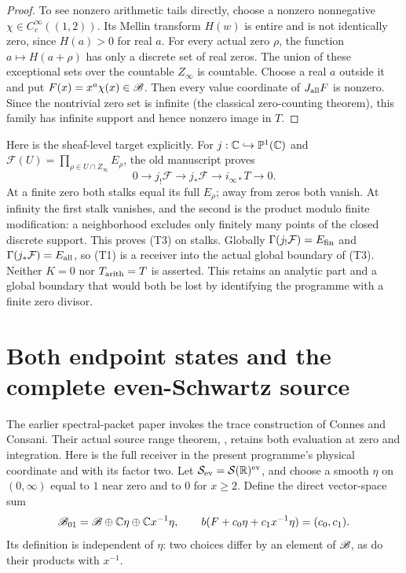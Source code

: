 \documentclass[11pt]{article}
\begin{document}
\begin{proof}
To see nonzero arithmetic tails directly, choose a nonzero nonnegative
$\chi\in C_c^\infty((1,2))$. Its Mellin transform $H(w)$ is entire
and is not identically zero, since $H(a)>0$ for real $a$.
For every actual zero $\rho$, the function $a\mapsto H(a+\rho)$
has only a discrete set of real zeros. The union of these exceptional
sets over the countable $Z_\infty$ is countable. Choose a real $a$
outside it and put $F(x)=x^a\chi(x)\in\mathscr B$.
Then every value coordinate of $J_{\rm all}F$ is nonzero. Since the
nontrivial zero set is infinite (the classical zero-counting theorem),
this family has infinite support and hence nonzero image in $T$.
\end{proof}

Here is the sheaf-level target explicitly. For $j:\mathbb C\hookrightarrow
\mathbb P^1(\mathbb C)$ and $\mathcal F(U)=\prod_{\rho\in U\cap Z_\infty}
E_\rho$, the old manuscript proves
\[
 0\to j_!\mathcal F\to j_*\mathcal F\to i_{\infty*}T\to0.\tag{T3}
\]
At a finite zero both stalks equal its full $E_\rho$; away from zeros
both vanish. At infinity the first stalk vanishes, and the second is
the product modulo finite modification: a neighborhood excludes only
finitely many points of the closed discrete support. This proves (T3)
on stalks. Globally $\Gamma(j_!\mathcal F)=E_{\rm fin}$ and
$\Gamma(j_*\mathcal F)=E_{\rm all}$, so (T1) is a receiver into the
actual global boundary of (T3). Neither $K=0$ nor $T_{\rm arith}=T$ is
asserted. This retains an analytic part and a global boundary that would
both be lost by identifying the programme with a finite zero divisor.

\section{Both endpoint states and the complete even-Schwartz source}
The earlier spectral-packet paper invokes the trace construction of Connes
and Consani. Their actual source range theorem, \cite[Lemma 4.1]{cr:CCcycles},
retains both evaluation at zero and integration. Here is the full receiver
in the present programme's physical coordinate and with its factor two.
Let $\mathcal S_{\rm ev}=\mathcal S(\mathbb R)^{\rm ev}$, and choose a smooth
$\eta$ on $(0,\infty)$ equal to $1$ near zero and to $0$ for $x\geq2$.
Define the direct vector-space sum
\[
 \mathscr B_{01}=\mathscr B\oplus\mathbb C\eta\oplus\mathbb C x^{-1}\eta,
 \qquad b(F+c_0\eta+c_1x^{-1}\eta)=(c_0,c_1).
\]
Its definition is independent of $\eta$: two choices differ by an element
of $\mathscr B$, as do their products with $x^{-1}$.
\end{document}
